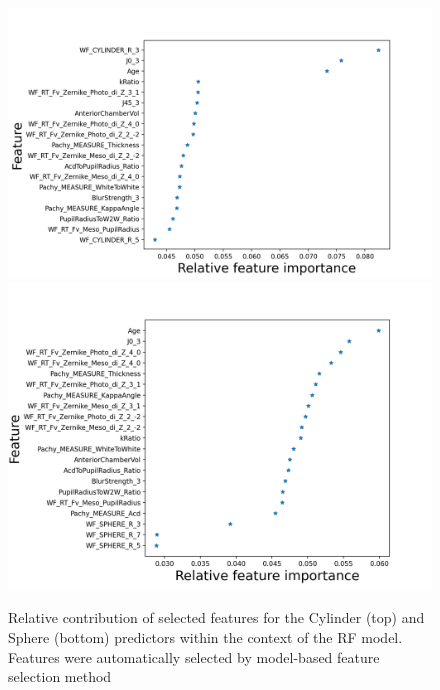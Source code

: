 \documentclass[article,twocolumn,preprint,10pt]{paper}%
\renewcommand{\(}{\left(}
\renewcommand{\)}{\right)}
\renewcommand{\[}{\left[}
\renewcommand{\]}{\right]}
\newcommand{\1}{\mbox{\boldmath$1$}}
\begin{document}
	\begin{figure}[h!]
		\includegraphics[width=1\linewidth]{featureImportanceCylinder.png}
		\includegraphics[width=1\linewidth]{featureImportanceSphere.png}
		\caption{Relative contribution of selected features for the Cylinder (top) and Sphere (bottom) predictors within the context of the RF model. Features were automatically selected by model-based feature selection method}
		\label{fig:featureIMportance}
	\end{figure}
\end{document}
